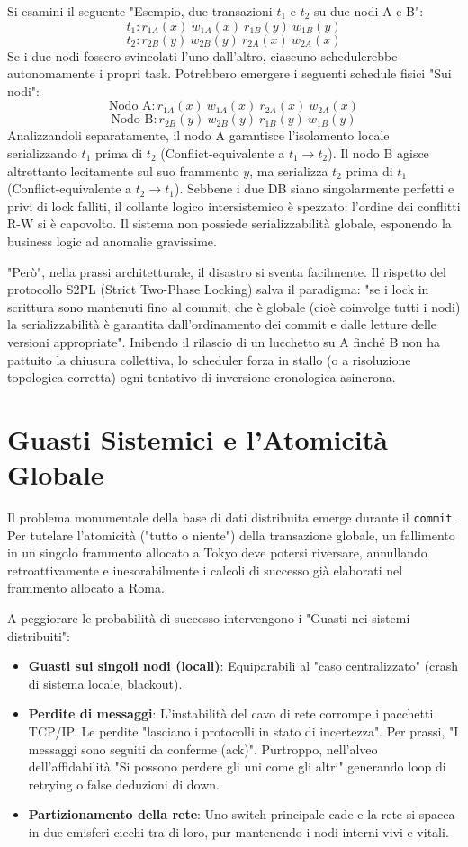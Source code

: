 Si esamini il seguente "Esempio, due transazioni $t_1$ e $t_2$ su due nodi A e B":
$$t_1: r_{1A}(x) \ w_{1A}(x) \ r_{1B}(y) \ w_{1B}(y)$$
$$t_2: r_{2B}(y) \ w_{2B}(y) \ r_{2A}(x) \ w_{2A}(x)$$
Se i due nodi fossero svincolati l'uno dall'altro, ciascuno schedulerebbe autonomamente i propri task. Potrebbero emergere i seguenti schedule fisici "Sui nodi":
$$\text{Nodo A}: r_{1A}(x) \ w_{1A}(x) \ r_{2A}(x) \ w_{2A}(x)$$
$$\text{Nodo B}: r_{2B}(y) \ w_{2B}(y) \ r_{1B}(y) \ w_{1B}(y)$$
Analizzandoli separatamente, il nodo A garantisce l'isolamento locale serializzando $t_1$ prima di $t_2$ (Conflict-equivalente a $t_1 \to t_2$). Il nodo B agisce altrettanto lecitamente sul suo frammento $y$, ma serializza $t_2$ prima di $t_1$ (Conflict-equivalente a $t_2 \to t_1$). Sebbene i due DB siano singolarmente perfetti e privi di lock falliti, il collante logico intersistemico è spezzato: l'ordine dei conflitti R-W si è capovolto. Il sistema non possiede serializzabilità globale, esponendo la business logic ad anomalie gravissime.

"Però", nella prassi architetturale, il disastro si sventa facilmente.
Il rispetto del protocollo S2PL (Strict Two-Phase Locking) salva il paradigma: "se i lock in scrittura sono mantenuti fino al commit, che è globale (cioè coinvolge tutti i nodi) la serializzabilità è garantita dall'ordinamento dei commit e dalle letture delle versioni appropriate". Inibendo il rilascio di un lucchetto su A finché B non ha pattuito la chiusura collettiva, lo scheduler forza in stallo (o a risoluzione topologica corretta) ogni tentativo di inversione cronologica asincrona.

\section{Guasti Sistemici e l'Atomicità Globale}

Il problema monumentale della base di dati distribuita emerge durante il \texttt{commit}. Per tutelare l'atomicità ("tutto o niente") della transazione globale, un fallimento in un singolo frammento allocato a Tokyo deve potersi riversare, annullando retroattivamente e inesorabilmente i calcoli di successo già elaborati nel frammento allocato a Roma.

A peggiorare le probabilità di successo intervengono i "Guasti nei sistemi distribuiti":
\begin{itemize}
    \item \textbf{Guasti sui singoli nodi (locali)}: Equiparabili al "caso centralizzato" (crash di sistema locale, blackout).
    \item \textbf{Perdite di messaggi}: L'instabilità del cavo di rete corrompe i pacchetti TCP/IP. Le perdite "lasciano i protocolli in stato di incertezza". Per prassi, "I messaggi sono seguiti da conferme (ack)". Purtroppo, nell'alveo dell'affidabilità "Si possono perdere gli uni come gli altri" generando loop di retrying o false deduzioni di down.
    \item \textbf{Partizionamento della rete}: Uno switch principale cade e la rete si spacca in due emisferi ciechi tra di loro, pur mantenendo i nodi interni vivi e vitali.
\end{itemize}

